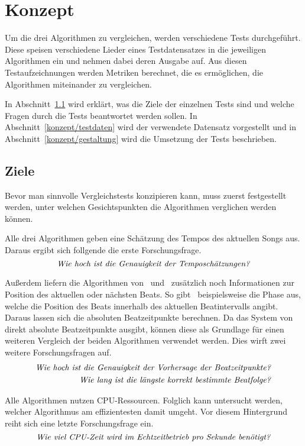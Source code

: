 \chapter{Konzept}
\label{konzept}

Um die drei Algorithmen zu vergleichen,
	werden verschiedene Tests durchgeführt.
Diese speisen verschiedene Lieder eines Testdatensatzes in die jeweiligen Algorithmen ein
	und nehmen dabei deren Ausgabe auf.
Aus diesen Testaufzeichnungen werden Metriken berechnet,
	die es ermöglichen,
	die Algorithmen miteinander zu vergleichen.

In Abschnitt~\ref{konzept/ziele} wird erklärt,
	was die Ziele der einzelnen Tests sind
	und welche Fragen durch die Tests beantwortet werden sollen.
In Abschnitt~\ref{konzept/testdaten} wird der verwendete Datensatz vorgestellt
	und in Abschnitt~\ref{konzept/gestaltung} wird die Umsetzung der Tests beschrieben.


\section{Ziele} \label{konzept/ziele}
{
	Bevor man sinnvolle Vergleichstests konzipieren kann,
		muss zuerst festgestellt werden,
		unter welchen Gesichtspunkten die Algorithmen verglichen werden können.

	Alle drei Algorithmen geben eine Schätzung des Tempos des aktuellen Songs aus.
	Daraus ergibt sich follgende die erste Forschungsfrage.
	\begin{equation}
		\label{question:tempo}
		\text{\emph{Wie hoch ist die Genauigkeit der Temposchätzungen?}}
	\end{equation}

	Au{\ss}erdem liefern die Algorithmen von~\cite{2009_DaPlSt} und~\cite{2011_PlRoSt} zusätzlich noch Informationen zur Position des aktuellen oder nächsten Beats.
	So gibt~\cite{2011_PlRoSt} beispielsweise die Phase aus,
		welche die Position des Beats innerhalb des aktuellen Beatintervalls angibt.
	Daraus lassen sich die absoluten Beatzeitpunkte berechnen.
	Da das System von~\cite{2009_DaPlSt} direkt absolute Beatzeitpunkte ausgibt,
		können diese als Grundlage für einen weiteren Vergleich der beiden Algorithmen verwendet werden.
	Dies wirft zwei weitere Forschungsfragen auf.
	\begin{align}
		\label{question:beat}
		\text{\emph{Wie hoch ist die Genauigkeit der Vorhersage der Beatzeitpunkte?}} \\
		\label{question:streak}
		\text{\emph{Wie lang ist die längste korrekt bestimmte Beatfolge?}}
	\end{align}

	Alle Algorithmen nutzen CPU-Ressourcen.
	Folglich kann untersucht werden,
		welcher Algorithmus am effizientesten damit umgeht.
	Vor diesem Hintergrund reiht sich eine letzte Forschungsfrage ein.
	\begin{equation}
		\label{question:cpu_time}
		\text{\emph{Wie viel CPU-Zeit wird im Echtzeitbetrieb pro Sekunde benötigt?}}
	\end{equation}
}

